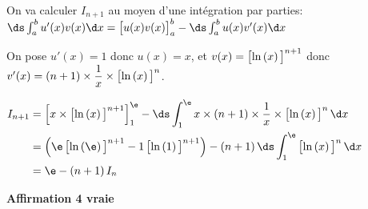 \begin{enumerate}
On va calculer $I_{n+1}$ au moyen d'une intégration par parties:\\
$\ds\int_{a}^{b} u'(x)v(x) \d x = \left [u(x) v(x)\strut \right ]_{a}^{b} - \ds\int_{a}^{b} u(x) v'(x) \d x$

On pose $u'(x)=1$ donc $u(x)=x$, et $v(x)= \left [\ln\left (x\right )\strut\right] ^{n+1}$ donc
$v'(x)=\left (n+1\right ) \times \dfrac{1}{x} \times \left [\ln\left (x\right )\strut\right ]^n$.

$\begin{aligned}[t]
I_{n+1} & =  \left [ x\times \left [\ln\left (x\right )\strut\right ]^{n+1}\right ]_{1}^{\e}
 - \ds\int_{1}^{\e} x\times (n+1) \times \dfrac{1}{x} \times \left [ \ln\left (x\right )\strut \right ]^n \d x\\
 & = \left ( \e \left [ \ln \left (\e\right )\strut \right ]^{n+1} - 1 \left [ \ln \left (1\right )\strut \right ]^{n+1}\right ) - \left (n+1\right ) \ds\int_{1}^{\e} \left [\ln\left (x\right )\strut\right ]^{n} \d x\\
&  = \e - \left (n+1\right ) I_n
 \end{aligned}$

\hfill \textbf{Affirmation 4 vraie}
\end{enumerate}

\vspace{0,5cm}

